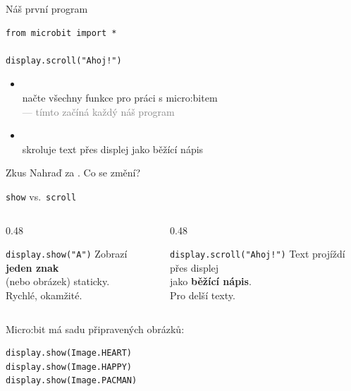 \begin{frame}[fragile]{Náš první program}

  \begin{lstlisting}
from microbit import *

display.scroll("Ahoj!")
  \end{lstlisting}

  \bigskip
  \begin{itemize}
    \item {}\\
          načte všechny funkce pro práci s micro:bitem\\
          \textcolor{gray}{\small — tímto začíná každý náš program}
    \item {}\\
          skroluje text přes displej jako běžící nápis
  \end{itemize}

  \pause\bigskip
  \begin{alertblock}{Zkus}
    Nahraď  za . Co se změní?
  \end{alertblock}
\end{frame}

\begin{frame}[fragile]{\texttt{show} vs.\ \texttt{scroll}}

  \begin{columns}[T]
    \begin{column}{0.48\textwidth}
      \begin{block}{\texttt{display.show("A")}}
        Zobrazí \textbf{jeden znak}\\
        (nebo obrázek) staticky.\\[6pt]
        Rychlé, okamžité.
      \end{block}
    \end{column}
    \begin{column}{0.48\textwidth}
      \begin{block}{\texttt{display.scroll("Ahoj!")}}
        Text projíždí přes displej\\
        jako \textbf{běžící nápis}.\\[6pt]
        Pro delší texty.
      \end{block}
    \end{column}
  \end{columns}

  \bigskip
  Micro:bit má sadu připravených obrázků:

  \begin{lstlisting}
display.show(Image.HEART)
display.show(Image.HAPPY)
display.show(Image.PACMAN)
  \end{lstlisting}
\end{frame}

